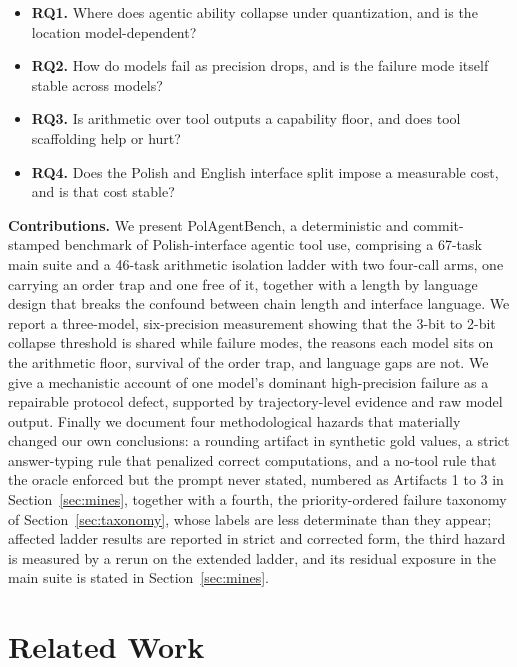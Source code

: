 \documentclass[11pt]{article}
\begin{document}
\begin{itemize}
  \item \textbf{RQ1.} Where does agentic ability collapse under quantization, and is the location model-dependent?
  \item \textbf{RQ2.} How do models fail as precision drops, and is the failure mode itself stable across models?
  \item \textbf{RQ3.} Is arithmetic over tool outputs a capability floor, and does tool scaffolding help or hurt?
  \item \textbf{RQ4.} Does the Polish and English interface split impose a measurable cost, and is that cost stable?
\end{itemize}

\noindent\textbf{Contributions.} We present PolAgentBench, a deterministic and commit-stamped benchmark of Polish-interface agentic tool use, comprising a 67-task main suite and a 46-task arithmetic isolation ladder with two four-call arms, one carrying an order trap and one free of it, together with a length by language design that breaks the confound between chain length and interface language. We report a three-model, six-precision measurement showing that the 3-bit to 2-bit collapse threshold is shared while failure modes, the reasons each model sits on the arithmetic floor, survival of the order trap, and language gaps are not. We give a mechanistic account of one model's dominant high-precision failure as a repairable protocol defect, supported by trajectory-level evidence and raw model output. Finally we document four methodological hazards that materially changed our own conclusions: a rounding artifact in synthetic gold values, a strict answer-typing rule that penalized correct computations, and a no-tool rule that the oracle enforced but the prompt never stated, numbered as Artifacts 1 to 3 in Section~\ref{sec:mines}, together with a fourth, the priority-ordered failure taxonomy of Section~\ref{sec:taxonomy}, whose labels are less determinate than they appear; affected ladder results are reported in strict and corrected form, the third hazard is measured by a rerun on the extended ladder, and its residual exposure in the main suite is stated in Section~\ref{sec:mines}.

\section{Related Work}
\end{document}
